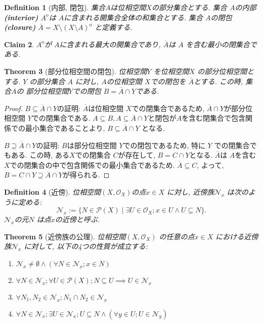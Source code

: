 \documentclass[lualatex]{ltjsbook}
\newcommand{\cl}[1]{\overline{ #1}  }
\newcommand{\Int}[1]{#1 ^{\mathrm{o}} }
\newtheorem{theorem}{Theorem}[chapter]
\newtheorem{definition}[theorem]{Definition}
\newtheorem{claim}[theorem]{Claim}
\theoremstyle{remark}
\theoremstyle{plain}
\begin{document}
\begin{definition}[内部,  閉包]
	集合$A$は位相空間$X$の部分集合とする. 
	集合 $A$の内部\textbf{(interior)} $\Int{A}$は $A$に含まれる開集合全体の和集合とする. 
	集合 $A$の閉包\textbf{(closure)} $\cl{A}= X \setminus\Int{ \left( X\setminus A \right)}$ と定義する.
\end{definition}

\begin{claim}
	$\Int{A}$が $A$に含まれる最大の開集合であり,   $\cl{A}$は $A$ を含む最小の閉集合である.
\end{claim}

\begin{theorem}[部分位相空間の閉包]
	位相空間$Y$ を位相空間$X$ の部分位相空間とする. 
	$Y$ の部分集合 $A$ に対し,  $A$の位相空間 $X$での閉包を $\cl{A}$とする.
	この時,  集合$A$の 部分位相空間$Y$での閉包 $B= \cl{A} \cap Y$である.
\end{theorem}

\begin{proof}
	$B \subseteq \cl{A} \cap Y $の証明:  $\cl{A}$は位相空間 $X$での閉集合であるため,   $\cl{A} \cap Y $が部分位相空間 $Y$での閉集合である.  
	$A \subseteq B,  A \subseteq \cl{A} \cap Y$と閉包が$A$を含む閉集合で包含関係での最小集合であることより,  $B \subseteq \cl{A} \cap Y$ となる.

	$B \supseteq \cl{A} \cap Y$の証明:  $B$は部分位相空間 $Y$での閉包であるため,  特に $Y$ での閉集合でもある. 
	この時,  ある$X$での閉集合 $C$が存在して,   $B=C \cap Y$となる.  
	$\cl{A}$は $A$を含む $X$での閉集合の中で包含関係での最小集合であるため. 
	$\cl{A} \subseteq C$,  よって,   $B = C \cap Y \supseteq \cl{A} \cap Y$が得られる.
\end{proof}


\begin{definition}[近傍]
	位相空間$\left( X,  \mathcal{O}_X \right)$の点$x \in X$ に対し,  近傍族$\mathcal{N}_x$ は次のように定める:
	\[
	\mathcal{N}_x := \{N \in \mathcal{P}\left( X \right)  \mid \exists U \in \mathcal{O}_X ; x \in U \land U \subseteq N \} 
	.\] 
	$\mathcal{N}_x $の元$N$ は点$x$の近傍と呼ぶ.
\end{definition}

\begin{theorem}[近傍族の公理]
	位相空間$\left( X , \mathcal{O}_X \right) $ の任意の点$x\in X$ における近傍族$\mathcal{N}_x$ に対して,  以下の4つの性質が成立する:
	\begin{enumerate}
		\item $\mathcal{N}_x \neq \emptyset \land \left( \forall N \in \mathcal{N}_x ; x \in N \right)$
		\item $\forall N \in \mathcal{N}_x; \forall U \in \mathcal{P}\left( X \right) ; N\subseteq U \implies U \in \mathcal{N}_x$
		\item $\forall N_1,  N_2 \in \mathcal{N}_x ; N_1 \cap N_2 \in \mathcal{N}_x$
		\item $\forall N \in \mathcal{N}_x; \exists U \in \mathcal{N}_x ;U\subseteq N\land \left( \forall y \in U; U \in \mathcal{N}_y  \right)  $
	\end{enumerate}
\end{theorem}
\end{document}

